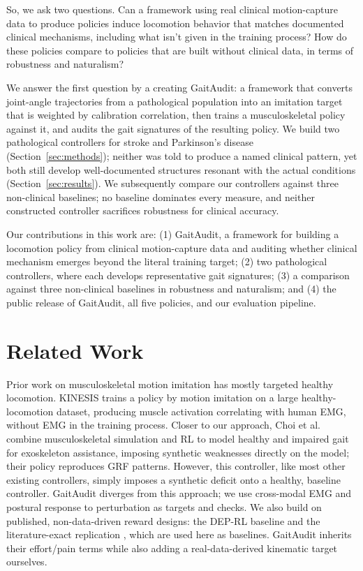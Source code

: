 \documentclass{article}
\begin{document}
So, we ask two questions. Can a framework using real clinical motion-capture data to produce policies induce locomotion behavior that matches documented clinical mechanisms, including what isn't given in the training process? How do these policies compare to policies that are built without clinical data, in terms of robustness and naturalism?

We answer the first question by a creating GaitAudit: a framework that converts joint-angle trajectories from a pathological population into an imitation target that is weighted by calibration correlation, then trains a musculoskeletal policy against it, and audits the gait signatures of the resulting policy. We build two pathological controllers for stroke and Parkinson's disease (Section~\ref{sec:methods}); neither was told to produce a named clinical pattern, yet both still develop well-documented structures resonant with the actual conditions (Section~\ref{sec:results}). We subsequently compare our controllers against three non-clinical baselines; no baseline dominates every measure, and neither constructed controller sacrifices robustness for clinical accuracy.

Our contributions in this work are: (1) GaitAudit, a framework for building a locomotion policy from clinical motion-capture data and auditing whether clinical mechanism emerges beyond the literal training target; (2) two pathological controllers, where each develops representative gait signatures; (3) a comparison against three non-clinical baselines in robustness and naturalism; and (4) the public release of GaitAudit, all five policies, and our evaluation pipeline.

\section{Related Work}

Prior work on musculoskeletal motion imitation has mostly targeted healthy locomotion. KINESIS \cite{simos2025kinesis} trains a policy by motion imitation on a large healthy-locomotion dataset, producing muscle activation correlating with human EMG, without EMG in the training process. Closer to our approach, Choi et al.~\cite{choi2026musculoskeletal} combine musculoskeletal simulation and RL to model healthy and impaired gait for exoskeleton assistance, imposing synthetic weaknesses directly on the model; their policy reproduces GRF patterns. However, this controller, like most other existing controllers, simply imposes a synthetic deficit onto a healthy, baseline controller. GaitAudit diverges from this approach; we use cross-modal EMG and postural response to perturbation as targets and checks. We also build on published, non-data-driven reward designs: the DEP-RL baseline \cite{schumacher2023deprl} and the literature-exact replication \cite{schumacher2023natural}, which are used here as baselines. GaitAudit inherits their effort/pain terms while also adding a real-data-derived kinematic target ourselves.
\end{document}
